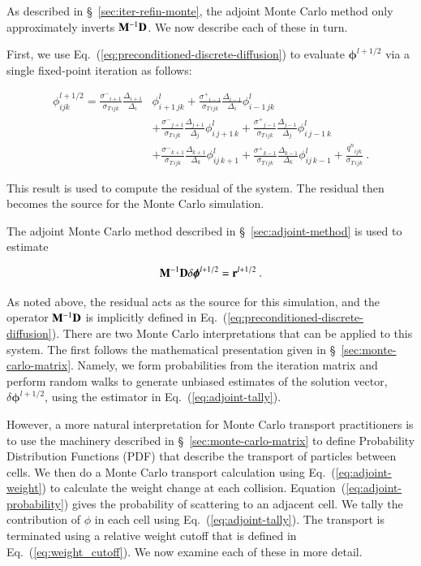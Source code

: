 \documentclass[preprint,12pt]{elsarticle}
\newcommand{\vr}{\ensuremath{\ve{r}}}
\newcommand{\qn}{\ensuremath{q^n}} \newcommand{\Tn}{\ensuremath{T^n}}
\newcommand{\Di}{\ensuremath{\Delta_i}}
\newcommand{\Dj}{\ensuremath{\Delta_j}}
\newcommand{\Dk}{\ensuremath{\Delta_k}}
\newcommand{\sigT}{\ensuremath{\sigma_{T\,ijk}}}
\newcommand{\sigm}{\ensuremath{\sigma^{-}}}
\newcommand{\sigp}{\ensuremath{\sigma^{+}}}
\newcommand{\bphi}{\ensuremath{\boldsymbol{\phi}}}
\begin{document}
As described in \S~\ref{sec:iter-refin-monte}, the adjoint Monte Carlo
method only approximately inverts $\mathbf{M}^{-1}\mathbf{D}$.  We now
describe each of these in turn.

First, we use Eq.~(\ref{eq:preconditioned-discrete-diffusion}) to
evaluate $\bphi^{l+1/2}$ via a single fixed-point iteration as
follows:

\begin{equation}
  \begin{aligned}
    \phi_{ijk}^{l+1/2} =
    \frac{\sigm_{i+1}}{\sigT}\frac{\Delta_{i+1}}{\Di}&\phi_{i+1\,jk}^l
    +
    \frac{\sigp_{i-1}}{\sigT}\frac{\Delta_{i-1}}{\Di}\phi_{i-1\,jk}^l
    \\ &+
    \frac{\sigm_{j+1}}{\sigT}\frac{\Delta_{j+1}}{\Dj}\phi_{i\,j+1\,k}^l
    +
    \frac{\sigp_{j-1}}{\sigT}\frac{\Delta_{j-1}}{\Dj}\phi_{i\,j-1\,k}^l
    \\ &+
    \frac{\sigm_{k+1}}{\sigT}\frac{\Delta_{k+1}}{\Dk}\phi_{ij\,k+1}^l
    +
    \frac{\sigp_{k-1}}{\sigT}\frac{\Delta_{k-1}}{\Dk}\phi_{ij\,k-1}^l
    + \frac{\qn_{ijk}}{\sigT}\:.
  \end{aligned}
\end{equation}

This result is used to compute the residual of the system.  The
residual then becomes the source for the Monte Carlo simulation.

The adjoint Monte Carlo method described in
\S~\ref{sec:adjoint-method} is used to estimate

\begin{equation}
  \ve{M}^{-1}\ve{D}\delta\bphi^{l+1/2} = \vr^{l+1/2}\:.
\end{equation}

As noted above, the residual acts as the source for this simulation,
and the operator $\mathbf{M}^{-1}\mathbf{D}$ is implicitly defined in
Eq.~(\ref{eq:preconditioned-discrete-diffusion}).  There are two Monte
Carlo interpretations that can be applied to this system.  The first
follows the mathematical presentation given in
\S~\ref{sec:monte-carlo-matrix}.  Namely, we form probabilities from
the iteration matrix and perform random walks to generate unbiased
estimates of the solution vector, $\delta\bphi^{l+1/2}$, using the
estimator in Eq.~(\ref{eq:adjoint-tally}).

However, a more natural interpretation for Monte Carlo transport
practitioners is to use the machinery described in
\S~\ref{sec:monte-carlo-matrix} to define Probability Distribution
Functions (PDF) that describe the transport of particles between
cells.  We then do a Monte Carlo transport calculation using
Eq.~(\ref{eq:adjoint-weight}) to calculate the weight change at each
collision. Equation~(\ref{eq:adjoint-probability}) gives the
probability of scattering to an adjacent cell. We tally the
contribution of $\phi$ in each cell using
Eq.~(\ref{eq:adjoint-tally}).  The transport is terminated using a
relative weight cutoff that is defined in
Eq.~(\ref{eq:weight_cutoff}).  We now examine each of these in
more detail.
\end{document}
